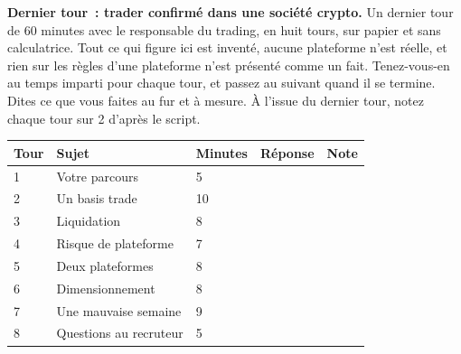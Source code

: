 \vfill\clearpage
\begin{question}\label{iq:iv2:mock-interviews:10}
\textbf{Dernier tour~: trader confirmé dans une société crypto.} Un dernier tour de 60 minutes avec le responsable du trading, en huit tours, sur papier et sans calculatrice. Tout ce qui figure ici est inventé, aucune plateforme n'est réelle, et rien sur les règles d'une plateforme n'est présenté comme un fait. Tenez-vous-en au temps imparti pour chaque tour, et passez au suivant quand il se termine. Dites ce que vous faites au fur et à mesure. À l'issue du dernier tour, notez chaque tour sur 2 d'après le script.

\medskip
\begin{tabular}{@{}l|l|l|l|l@{}}
Tour & Sujet & Minutes & Réponse & Note \\ \hline
1 & Votre parcours & 5 & & \\[6pt]\hline
2 & Un basis trade & 10 & & \\[6pt]\hline
3 & Liquidation & 8 & & \\[6pt]\hline
4 & Risque de plateforme & 7 & & \\[6pt]\hline
5 & Deux plateformes & 8 & & \\[6pt]\hline
6 & Dimensionnement & 8 & & \\[6pt]\hline
7 & Une mauvaise semaine & 9 & & \\[6pt]\hline
8 & Questions au recruteur & 5 & & \\[6pt]\hline
\end{tabular}
\end{question}

